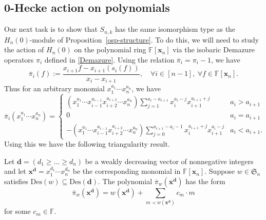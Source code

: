 \documentclass[ALCO,ThmDefs,published]{cedram}
\newcommand{\symm}{{\mathfrak{S}}}
\newcommand{\xx}{{\mathbf {x}}}
\newcommand{\FF}{{\mathbb{F}}}
\theoremstyle{plain}
\newcommand{\Des}{{\mathrm {Des}}}
\newcommand{\symm}{{\mathfrak{S}}}
\newcommand{\FF}{{\mathbb{F}}}
\newcommand{\xx}{{\mathbf {x}}}
\newcommand{\dd}{{\mathbf {d}}}
\newcommand{\pib}{\overline{\pi}}
\begin{document}
\subsection{0-Hecke action on polynomials}
Our next task is to show that $S_{n,k}$ has the same isomorphism type as the $H_n(0)$-module of 
Proposition~\ref{osp-structure}.
To do this, we will need to study the action of $H_n(0)$ on the polynomial ring $\FF[\xx_n]$ via the isobaric Demazure operators $\pi_i$ defined in \eqref{Demazure}.
Using the relation $\pib_i=\pi_i-1$, we have
\[ \pib_i(f) := \frac{x_{i+1} f - x_{i+1} (s_i(f))}{x_i - x_{i+1}},\quad \forall i\in[n-1],\ \forall f\in\FF[\xx_n]. \]
Thus for an arbitrary monomial $x_1^{a_1} \cdots x_n^{a_n}$, we have 
\begin{equation}\label{pi-bar}
\pib_i(x_1^{a_1} \cdots x_n^{a_n}) = \begin{cases}
\displaystyle (x_1^{a_1} \cdots x_{i-1}^{a_{i-1}} x_{i+2}^{a_{i+2}} \cdots x_n^{a_n}) \sum_{j = 1}^{a_i - a_{i+1}} x_i^{a_i - j} x_{i+1}^{a_{i+1}+j} & a_i > a_{i+1} \\
0 & a_i = a_{i+1} \\
\displaystyle -(x_1^{a_1} \cdots x_{i-1}^{a_{i-1}} x_{i+2}^{a_{i+2}} \cdots x_n^{a_n})   \sum_{j = 0}^{a_{i+1} - a_i-1} x_i^{a_{i+1} + j} x_{i+1}^{a_i - j} & a_i<a_{i+1}.
\end{cases} 
\end{equation}
Using this we have the following triangularity result.

\begin{lemma}
\label{demazure-leading-term}
Let $\dd = (d_1 \geq \dots \geq d_n)$ be a weakly decreasing vector of nonnegative integers and let 
$\xx^{\dd} = x_1^{d_1} \cdots x_n^{d_n}$ be the corresponding monomial in $\FF[\xx_n]$.
Suppose $w \in \symm_n$ satisfies $\Des(w) \subseteq \Des(\dd)$.  
The polynomial $\pib_w (\xx^{\dd})$ has the form
\begin{equation}
\pib_w(\xx^{\dd}) = w(\xx^{\dd}) + \sum_{m \prec w(\xx^{\dd})} c_m \cdot m
\end{equation}
for some $c_m \in \FF$.
\end{lemma}
\end{document}
